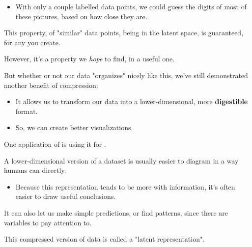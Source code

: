        \begin{itemize}
            \item With only a couple labelled data points, we could guess the digits of most of these pictures, based on how close they are.\\
        \end{itemize}

        \begin{clarification}
            This property, of "similar" data points, being  in the latent space, is  guaranteed, for any  you create.

            However, it's a property we \textit{hope} to find, in a useful one.
        \end{clarification}

        But whether or not our data "organizes" nicely like this, we've still demonstrated another benefit of compression:

        \begin{itemize}
            \item It allows us to transform our data into a lower-dimensional, more \textbf{digestible} format.
            \item So, we can create better visualizations.\\
        \end{itemize}

    
        \begin{concept}
            One application of  is using it for .
    
            A lower-dimensional version of a dataset is usually easier to diagram in a way humans can  directly.

            \begin{itemize}
                \item Because this representation tends to be more  with information, it's often easier to draw useful conclusions.
            \end{itemize}
    
            It can also let us make simple predictions, or find patterns, since there are  variables to pay attention to.
        \end{concept}


        This compressed version of data is called a "latent representation".\\

